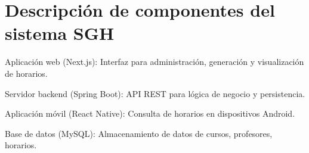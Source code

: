 \appendix
\section{Descripción de componentes del sistema SGH}
Aplicación web (Next.js): Interfaz para administración, generación y visualización de horarios.

Servidor backend (Spring Boot): API REST para lógica de negocio y persistencia.

Aplicación móvil (React Native): Consulta de horarios en dispositivos Android.

Base de datos (MySQL): Almacenamiento de datos de cursos, profesores, horarios.